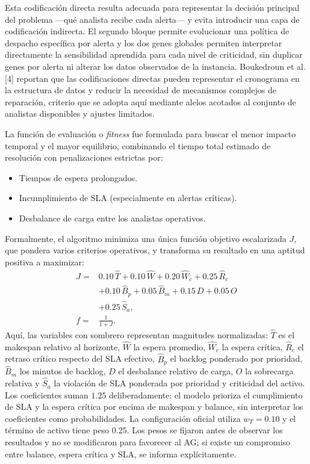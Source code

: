 \documentclass[12pt,a4paper,twocolumn]{article}
\begin{document}
Esta codificación directa resulta adecuada para representar la decisión principal del problema ---qué analista recibe cada alerta--- y evita introducir una capa de codificación indirecta. El segundo bloque permite evolucionar una política de despacho específica por alerta y los dos genes globales permiten interpretar directamente la sensibilidad aprendida para cada nivel de criticidad, sin duplicar genes por alerta ni alterar los datos observados de la instancia. Boukedroun et al. [4] reportan que las codificaciones directas pueden representar el cronograma en la estructura de datos y reducir la necesidad de mecanismos complejos de reparación, criterio que se adopta aquí mediante alelos acotados al conjunto de analistas disponibles y ajustes limitados.

La función de evaluación o \textit{fitness} fue formulada para buscar el menor impacto temporal y el mayor equilibrio, combinando el tiempo total estimado de resolución con penalizaciones estrictas por:
\begin{itemize}
    \item Tiempos de espera prolongados.
    \item Incumplimiento de SLA (especialmente en alertas críticas).
    \item Desbalance de carga entre los analistas operativos.
\end{itemize}

Formalmente, el algoritmo minimiza una única función objetivo escalarizada $J$, que pondera varios criterios operativos, y transforma su resultado en una aptitud positiva a maximizar:
\begin{equation}
\begin{aligned}
J ={}& 0.10\,\widehat{T} + 0.10\,\widehat{W}
  + 0.20\,\widehat{W}_c + 0.25\,\widehat{R}_c \\
  &+ 0.10\,\widehat{B}_p + 0.05\,\widehat{B}_m
  + 0.15\,D + 0.05\,O \\
  &+ 0.25\,\widehat{S}_a, \\
f ={}& \frac{1}{1 + J}.
\end{aligned}
\end{equation}
Aquí, las variables con sombrero representan magnitudes normalizadas: $\widehat{T}$ es el makespan relativo al horizonte, $\widehat{W}$ la espera promedio, $\widehat{W}_c$ la espera crítica, $\widehat{R}_c$ el retraso crítico respecto del SLA efectivo, $\widehat{B}_p$ el backlog ponderado por prioridad, $\widehat{B}_m$ los minutos de backlog, $D$ el desbalance relativo de carga, $O$ la sobrecarga relativa y $\widehat{S}_a$ la violación de SLA ponderada por prioridad y criticidad del activo. Los coeficientes suman $1.25$ deliberadamente: el modelo prioriza el cumplimiento de SLA y la espera crítica por encima de makespan y balance, sin interpretar los coeficientes como probabilidades. La configuración oficial utiliza $w_T=0.10$ y el término de activo tiene peso $0.25$. Los pesos se fijaron antes de observar los resultados y no se modificaron para favorecer al AG; si existe un compromiso entre balance, espera crítica y SLA, se informa explícitamente.
\end{document}

